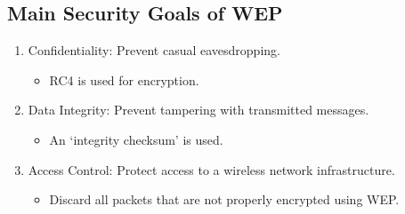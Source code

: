 \subsection*{Main Security Goals of WEP}
\begin{enumerate}
      \item Confidentiality: Prevent casual eavesdropping.
            \begin{itemize}
                  \item RC4 is used for encryption.
            \end{itemize}
      \item Data Integrity: Prevent tampering with transmitted messages.
            \begin{itemize}
                  \item An `integrity checksum' is used.
            \end{itemize}
      \item Access Control: Protect access to a wireless network infrastructure.
            \begin{itemize}
                  \item Discard all packets that are not properly encrypted using WEP\@.
            \end{itemize}
\end{enumerate}

